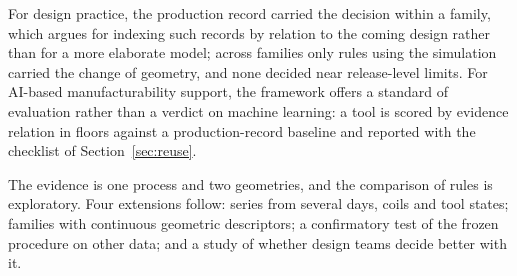 \documentclass[pdflatex,sn-basic,lineno]{sn-jnl}
\begin{document}
For design practice, the production record carried the decision within a family, which argues for indexing such records by relation to the coming design rather than for a more elaborate model; across families only rules using the simulation carried the change of geometry, and none decided near release-level limits. For AI-based manufacturability support, the framework offers a standard of evaluation rather than a verdict on machine learning: a tool is scored by evidence relation in floors against a production-record baseline and reported with the checklist of Section~\ref{sec:reuse}.

The evidence is one process and two geometries, and the comparison of rules is exploratory. Four extensions follow: series from several days, coils and tool states; families with continuous geometric descriptors; a confirmatory test of the frozen procedure on other data; and a study of whether design teams decide better with it.

\end{document}
